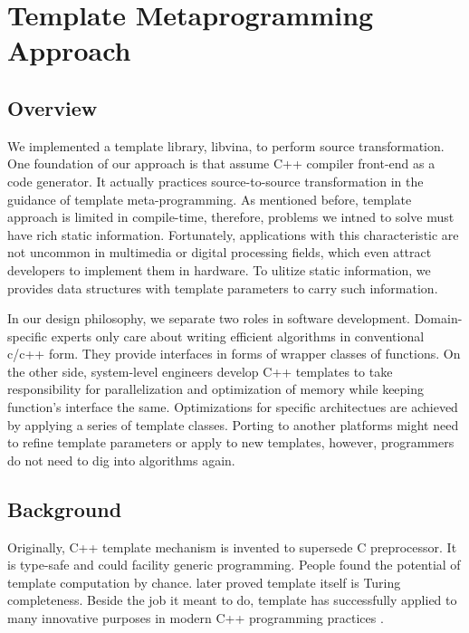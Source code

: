 \documentclass[10pt, conference, compsocconf]{IEEEtran}
\begin{document}
\section{Template Metaprogramming Approach}
\subsection{Overview}
We implemented a template library, libvina, to perform source
transformation. One foundation of our approach is that assume C++
compiler front-end as a code generator. It actually practices
source-to-source transformation in the guidance of template
meta-programming. As mentioned before, template approach is limited in
compile-time, therefore, problems we intned to solve must have rich static
information. Fortunately,  applications with this characteristic are
not uncommon in multimedia or digital processing fields, which
even attract developers to implement them in hardware. To ulitize
static information, we provides data structures with
template parameters to carry such information. 


In our design philosophy, we separate two roles in software
development. Domain-specific experts only care about writing efficient
algorithms in conventional c/c++ form. They provide interfaces in
forms of wrapper classes of functions. On the other side, system-level engineers develop C++ templates to take responsibility for
parallelization and optimization of memory while keeping function's
interface the same. Optimizations for specific architectues are
achieved by applying a series of template classes. Porting to another platforms might need to refine
template parameters or apply to new templates, however, programmers do
not need to dig into algorithms again.

\subsection{Background}
Originally, C++ template mechanism is invented to supersede C preprocessor. It is type-safe and could facility generic programming. People found the potential of template computation by chance. \cite{b6} later proved template itself is Turing completeness. Beside the job it meant to do, template has successfully applied to many innovative purposes in modern C++ programming practices \cite{b9}. 
\end{document}
